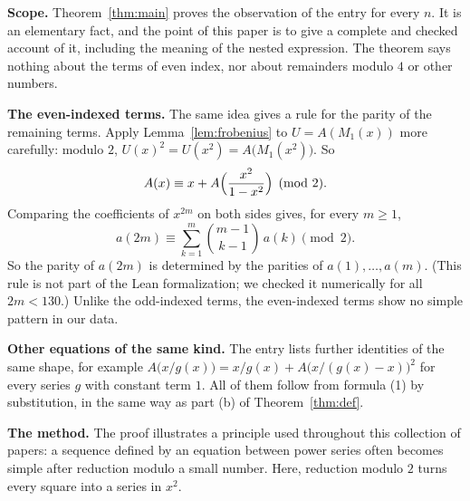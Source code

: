 \documentclass[11pt,a4paper]{article}
\theoremstyle{definition}
\theoremstyle{remark}
\newcommand{\para}[1]{\par\medskip\noindent\textbf{#1}\enspace}
\begin{document}
\para{Scope.} Theorem~\ref{thm:main} proves the observation of the entry for every $n$. It is an elementary fact, and the
point of this paper is to give a complete and checked account of it, including the meaning of the nested expression.
The theorem says nothing about the terms of even index, nor about remainders modulo $4$ or other numbers.

\para{The even-indexed terms.} The same idea gives a rule for the parity of the remaining terms. Apply
Lemma~\ref{lem:frobenius} to $U=A(M_1(x))$ more carefully: modulo $2$, $U(x)^2=U(x^2)=A\bigl(M_1(x^2)\bigr)$. So
\[
A(x)\equiv x+A\Bigl(\frac{x^2}{1-x^2}\Bigr)\pmod 2 .
\]
Comparing the coefficients of $x^{2m}$ on both sides gives, for every $m\ge1$,
\[
a(2m)\equiv\sum_{k=1}^{m}\binom{m-1}{k-1}\,a(k)\pmod 2 .
\]
So the parity of $a(2m)$ is determined by the parities of $a(1),\dots,a(m)$. (This rule is not part of the Lean
formalization; we checked it numerically for all $2m<130$.) Unlike the odd-indexed terms, the even-indexed terms show no
simple pattern in our data.

\para{Other equations of the same kind.} The entry lists further identities of the same shape, for example
$A\bigl(x/g(x)\bigr)=x/g(x)+A\bigl(x/(g(x)-x)\bigr)^2$ for every series $g$ with constant term
$1$. All of them follow from formula (1) by substitution, in the same way as part (b) of Theorem~\ref{thm:def}.

\para{The method.} The proof illustrates a principle used throughout this collection of papers: a sequence defined by an
equation between power series often becomes simple after reduction modulo a small number. Here, reduction modulo $2$
turns every square into a series in $x^2$.
\end{document}
